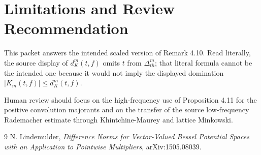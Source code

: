 \documentclass[11pt]{article}
\newcommand{\abs}[1]{\left\lvert #1 \right\rvert}
\begin{document}
\section*{Limitations and Review Recommendation}

This packet answers the intended scaled version of Remark 4.10.  Read
literally, the source display of \(d^m_K(t,f)\) omits \(t\) from
\(\Delta^m_{t h}\); that literal formula cannot be the intended one because
it would not imply the displayed domination \(\abs{K_m(t,f)}\le d^m_K(t,f)\).

Human review should focus on the high-frequency use of Proposition 4.11 for
the positive convolution majorants and on the transfer of the source
low-frequency Rademacher estimate through Khintchine-Maurey and lattice
Minkowski.

\begin{thebibliography}{9}
N. Lindemulder,
\emph{Difference Norms for Vector-Valued Bessel Potential Spaces with an
Application to Pointwise Multipliers},
arXiv:1505.08039.
\end{thebibliography}
\end{document}

